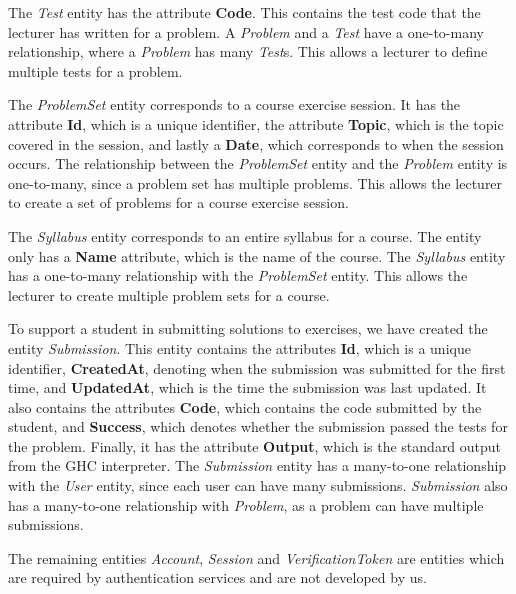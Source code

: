 The \textit{Test} entity has the attribute \textbf{Code}. This contains the test code that the lecturer has written for a problem. A \textit{Problem} and a \textit{Test} have a one-to-many relationship, where a \textit{Problem} has many \textit{Test}s. This allows a lecturer to define multiple tests for a problem.

The \textit{ProblemSet} entity corresponds to a course exercise session. It has the attribute \textbf{Id}, which is a unique identifier, the attribute \textbf{Topic}, which is the topic covered in the session, and lastly a \textbf{Date}, which corresponds to when the session occurs. The relationship between the \textit{ProblemSet} entity and the \textit{Problem} entity is one-to-many, since a problem set has multiple problems. This allows the lecturer to create a set of problems for a course exercise session.

The \textit{Syllabus} entity corresponds to an entire syllabus for a course. The entity only has a \textbf{Name} attribute, which is the name of the course. The \textit{Syllabus} entity has a one-to-many relationship with the \textit{ProblemSet} entity. This allows the lecturer to create multiple problem sets for a course.

To support a student in submitting solutions to exercises, we have created the entity \textit{Submission}. This entity contains the attributes \textbf{Id}, which is a unique identifier, \textbf{CreatedAt}, denoting when the submission was submitted for the first time, and \textbf{UpdatedAt}, which is the time the submission was last updated. It also contains the attributes \textbf{Code}, which contains the code submitted by the student, and \textbf{Success}, which denotes whether the submission passed the tests for the problem. Finally, it has the attribute \textbf{Output}, which is the standard output from the GHC interpreter.
The \textit{Submission} entity has a many-to-one relationship with the \textit{User} entity, since each user can have many submissions. \textit{Submission} also has a many-to-one relationship with \textit{Problem}, as a problem can have multiple submissions.

The remaining entities \textit{Account}, \textit{Session} and \textit{VerificationToken} are entities which are required by authentication services and are not developed by us.

